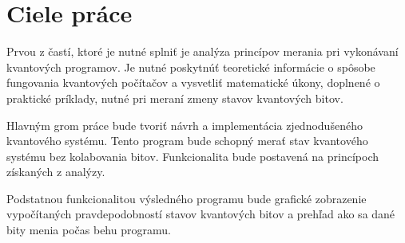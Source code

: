 
\chapter{Ciele práce}

Prvou z častí, ktoré je nutné splniť je analýza princípov merania pri 
vykonávaní kvantových programov. Je nutné poskytnúť teoretické informácie
o spôsobe fungovania kvantových počítačov a vysvetliť matematické úkony,
doplnené o praktické príklady, nutné pri meraní zmeny stavov kvantových 
bitov.

Hlavným grom práce bude tvoriť návrh a implementácia zjednodušeného 
kvantového systému. Tento program bude schopný merať stav kvantového systému 
bez kolabovania bitov. Funkcionalita bude postavená na princípoch získaných
z analýzy.

Podstatnou funkcionalitou výsledného programu bude grafické zobrazenie 
vypočítaných pravdepodobností stavov kvantových bitov a prehľad ako sa dané
bity menia počas behu programu.


